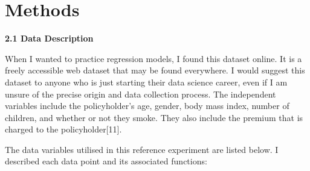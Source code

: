 \documentclass[journal]{IEEEtran}
\begin{document}
\section{Methods}
\textbf{2.1 Data Description}
\par When I wanted to practice regression models, I found this dataset online. It is a freely accessible web dataset that may be found everywhere. I would suggest this dataset to anyone who is just starting their data science career, even if I am unsure of the precise origin and data collection process. The independent variables include the policyholder's age, gender, body mass index, number of children, and whether or not they smoke. They also include the premium that is charged to the policyholder[11].

\par The data variables utilised in this reference experiment are listed below. I described each data point and its associated functions:
\end{document}
